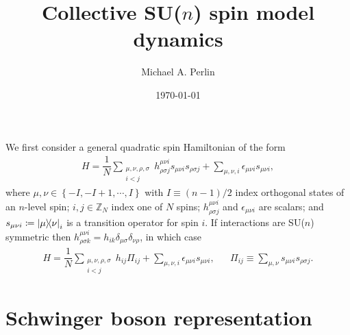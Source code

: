 \documentclass[nofootinbib,notitlepage,11pt]{revtex4-2}
\newcommand{\f}[2]{\dfrac{#1}{#2}} %
\newcommand{\p}[1]{\left(#1\right)} %
\renewcommand{\set}[1]{\left\{#1\right\}} %
\renewcommand{\i}{\mathrm{i}\mkern1mu} %
\newcommand{\1}{\mathds{1}}
\newcommand{\ZZ}{\mathbb{Z}}
\begin{document}
\thispagestyle{fancy}


\title{Collective SU($n$) spin model dynamics}%
\author{Michael A. Perlin}%
\date{\today}

\maketitle

We first consider a general quadratic spin Hamiltonian of the form
\begin{align}
  H = \f1N \sum_{\substack{\mu,\nu,\rho,\sigma\\i<j}}
  h^{\mu\nu i}_{\rho\sigma j} s_{\mu\nu i} s_{\rho\sigma j}
  + \sum_{\mu,\nu,i} \epsilon_{\mu\nu i} s_{\mu\nu i},
  \label{eq:spin}
\end{align}
where $\mu,\nu\in\set{-I,-I+1,\cdots,I}$ with $I\equiv\p{n-1}/2$ index
orthogonal states of an $n$-level spin; $i,j\in\ZZ_N$ index one of $N$
spins; $h^{\mu\nu i}_{\rho\sigma j}$ and $\epsilon_{\mu\nu i}$ are
scalars; and $s_{\mu\nu i}\coloneqq\op{\mu}{\nu}_i$ is a transition
operator for spin $i$.  If interactions are SU($n$) symmetric then
$h^{\mu\nu i}_{\rho\sigma k} = h_{ik}
\delta_{\mu\sigma}\delta_{\nu\rho}$, in which case
\begin{align}
  H = \f1N \sum_{\substack{\mu,\nu,\rho,\sigma\\i<j}}
  h_{ij} \Pi_{ij}
  + \sum_{\mu,\nu,i} \epsilon_{\mu\nu i} s_{\mu\nu i},
  &&
  \Pi_{ij} \equiv \sum_{\mu,\nu} s_{\mu\nu i} s_{\rho\sigma j}.
  \label{eq:spin_sun}
\end{align}

\section{Schwinger boson representation}
\end{document}
